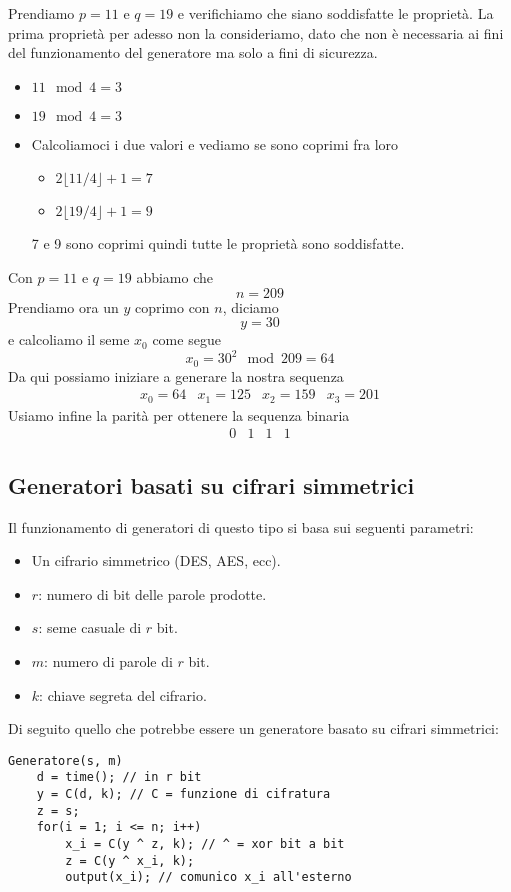 \begin{example}
	Prendiamo $p = 11$ e $q = 19$ e verifichiamo che siano soddisfatte le propriet\`a. La prima propriet\`a per adesso
	non la consideriamo, dato che non \`e necessaria ai fini del funzionamento del generatore ma solo a fini di sicurezza.
	\begin{itemize}
		\item $11 \mod{4} = 3$
		\item $19 \mod{4} = 3$
		\item Calcoliamoci i due valori e vediamo se sono coprimi fra loro
		      \begin{itemize}
			      \item $2 \lfloor 11 / 4 \rfloor + 1 = 7$
			      \item $2 \lfloor 19 / 4 \rfloor + 1 = 9$
		      \end{itemize}
		      7 e 9 sono coprimi quindi tutte le propriet\`a sono soddisfatte.
	\end{itemize}
	Con $p = 11$ e $q = 19$ abbiamo che
	\[ n = 209 \]
	Prendiamo ora un $y$ coprimo con $n$, diciamo
	\[ y = 30 \]
	e calcoliamo il seme $x_0$ come segue
	\[ x_0 = 30^2 \mod{209} = 64 \]
	Da qui possiamo iniziare a generare la nostra sequenza
	\[ \begin{matrix} x_0 = 64 & x_1 = 125 & x_2 = 159 & x_3 = 201 \end{matrix} \]
	Usiamo infine la parit\`a per ottenere la sequenza binaria
	\[ \begin{matrix} 0 & 1 & 1 & 1 \end{matrix} \]
\end{example}

\subsection{Generatori basati su cifrari simmetrici}
Il funzionamento di generatori di questo tipo si basa sui seguenti parametri:
\begin{itemize}
	\item Un cifrario simmetrico (DES, AES, ecc).
	\item $r$: numero di bit delle parole prodotte.
	\item $s$: seme casuale di $r$ bit.
	\item $m$: numero di parole di $r$ bit.
	\item $k$: chiave segreta del cifrario.
\end{itemize}
Di seguito quello che potrebbe essere un generatore basato su cifrari simmetrici:
\begin{lstlisting}[style=pseudo-style]
Generatore(s, m)
	d = time(); // in r bit 
	y = C(d, k); // C = funzione di cifratura 
	z = s;
	for(i = 1; i <= n; i++)
		x_i = C(y ^ z, k); // ^ = xor bit a bit
		z = C(y ^ x_i, k);
		output(x_i); // comunico x_i all'esterno
\end{lstlisting}